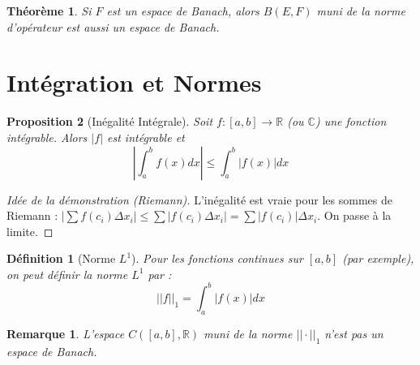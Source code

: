 \documentclass{article}
\newtheorem{theorem}{Théorème}
\newtheorem{proposition}[theorem]{Proposition}
\newtheorem{definition}{Définition}
\newtheorem{remark}{Remarque}
\begin{document}
\begin{theorem}
Si $F$ est un espace de Banach, alors $B(E, F)$ muni de la norme d'opérateur est aussi un espace de Banach.
\end{theorem}

\section{Intégration et Normes}

\begin{proposition}[Inégalité Intégrale]
Soit $f: [a, b] \to \mathbb{R}$ (ou $\mathbb{C}$) une fonction intégrable. Alors $|f|$ est intégrable et
\[
\left| \int_a^b f(x) dx \right| \le \int_a^b |f(x)| dx
\]
\end{proposition}
\begin{proof}[Idée de la démonstration (Riemann)]
L'inégalité est vraie pour les sommes de Riemann : $|\sum f(c_i) \Delta x_i| \le \sum |f(c_i) \Delta x_i| = \sum |f(c_i)| \Delta x_i$. On passe à la limite.
\end{proof}

\begin{definition}[Norme $L^1$]
Pour les fonctions continues sur $[a, b]$ (par exemple), on peut définir la norme $L^1$ par :
\[
||f||_1 = \int_a^b |f(x)| dx
\]
\end{definition}

\begin{remark}
L'espace $C([a, b], \mathbb{R})$ muni de la norme $||\cdot||_1$ n'est pas un espace de Banach.
\end{remark}
\end{document}
